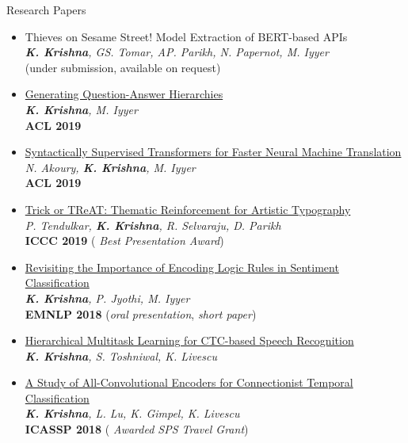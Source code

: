 \documentclass{resume} %
\begin{document}
\begin{rSection}{Research Papers}
\vspace*{0.1in}
\begin{itemize}[leftmargin=*]
\item Thieves on Sesame Street! Model Extraction of BERT-based APIs \\ \textit{\textbf{K. Krishna}, GS. Tomar, AP. Parikh, N. Papernot, M. Iyyer} \\ (under submission, available on request)
\item \href{https://arxiv.org/abs/1906.02622}{Generating Question-Answer Hierarchies} \\ \textit{\textbf{K. Krishna}, M. Iyyer} \\ \textbf{ACL 2019}
\item \href{https://arxiv.org/abs/1906.02780}{Syntactically Supervised Transformers for Faster Neural Machine Translation} \\ \textit{N. Akoury, \textbf{K. Krishna}, M. Iyyer} \\ \textbf{ACL 2019}
\item \href{https://arxiv.org/abs/1903.07820}{Trick or TReAT: Thematic Reinforcement for Artistic Typography} \\ \textit{P. Tendulkar, \textbf{K. Krishna}, R. Selvaraju, D. Parikh} \\ \textbf{ICCC 2019} ({\color{red} \textit{Best Presentation Award}})
\item \href{https://arxiv.org/abs/1808.07733}{Revisiting the Importance of Encoding Logic Rules in Sentiment Classification} \\ \textit{\textbf{K. Krishna}, P. Jyothi, M. Iyyer} \\ \textbf{EMNLP 2018} ({\color{red}\textit{oral presentation}}, \textit{short paper})
\item \href{https://arxiv.org/abs/1807.06234}{Hierarchical Multitask Learning for CTC-based Speech Recognition} \\ \textit{\textbf{K. Krishna}, S. Toshniwal, K. Livescu}
\item \href{https://arxiv.org/abs/1710.10398}{A Study of All-Convolutional Encoders for Connectionist Temporal Classification}\\ \textit{\textbf{K. Krishna}, L. Lu, K. Gimpel,  K. Livescu}\\ \textbf{ICASSP 2018} ({\color{red} \textit{Awarded SPS Travel Grant}})
\end{itemize}
\end{rSection}
\end{document}
